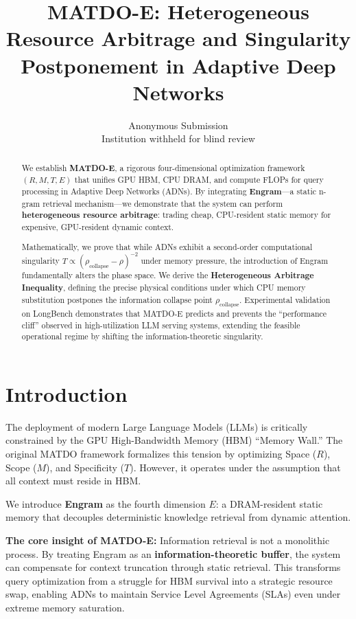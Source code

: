 \documentclass[11pt,a4paper]{article}
\title{\textbf{MATDO-E: Heterogeneous Resource Arbitrage and Singularity Postponement in Adaptive Deep Networks}}
\author{Anonymous Submission\\Institution withheld for blind review}
\date{}
\theoremstyle{plain}
\theoremstyle{definition}
\begin{document}
\maketitle

\begin{abstract}
We establish \textbf{MATDO-E}, a rigorous four-dimensional optimization framework $(R, M, T, E)$ that unifies GPU HBM, CPU DRAM, and compute FLOPs for query processing in Adaptive Deep Networks (ADNs). By integrating \textbf{Engram}---a static n-gram retrieval mechanism---we demonstrate that the system can perform \textbf{heterogeneous resource arbitrage}: trading cheap, CPU-resident static memory for expensive, GPU-resident dynamic context. 

Mathematically, we prove that while ADNs exhibit a second-order computational singularity $T \propto (\rho_{\text{collapse}} - \rho)^{-2}$ under memory pressure, the introduction of Engram fundamentally alters the phase space. We derive the \textbf{Heterogeneous Arbitrage Inequality}, defining the precise physical conditions under which CPU memory substitution postpones the information collapse point $\rho_{\text{collapse}}$. Experimental validation on LongBench demonstrates that MATDO-E predicts and prevents the ``performance cliff'' observed in high-utilization LLM serving systems, extending the feasible operational regime by shifting the information-theoretic singularity.
\end{abstract}

\section{Introduction}

The deployment of modern Large Language Models (LLMs) is critically constrained by the GPU High-Bandwidth Memory (HBM) ``Memory Wall.'' The original MATDO framework formalizes this tension by optimizing Space ($R$), Scope ($M$), and Specificity ($T$). However, it operates under the assumption that all context must reside in HBM. 

We introduce \textbf{Engram} as the fourth dimension $E$: a DRAM-resident static memory that decouples deterministic knowledge retrieval from dynamic attention. 

\textbf{The core insight of MATDO-E:} Information retrieval is not a monolithic process. By treating Engram as an \textbf{information-theoretic buffer}, the system can compensate for context truncation through static retrieval. This transforms query optimization from a struggle for HBM survival into a strategic resource swap, enabling ADNs to maintain Service Level Agreements (SLAs) even under extreme memory saturation.
\end{document}
